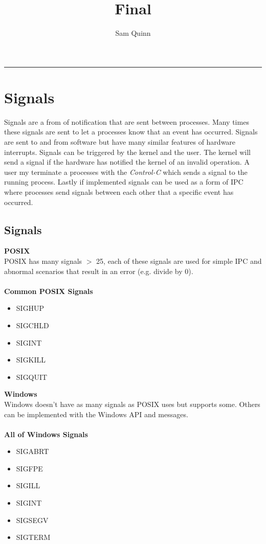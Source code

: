 \documentclass[letterpaper,10pt,notitlepage,fleqn]{article}
\title{Final}
\author{Sam Quinn}
\begin{document}
\maketitle
\hrule

\section{Signals}
Signals are a from of notification that are sent between processes. Many times these signals are sent to let a processes know that an event has occurred. Signals are sent to and from software but have many similar features of hardware interrupts. Signals can be triggered by the kernel and the user. The kernel will send a signal if the hardware has notified the kernel of an invalid operation. A user my terminate a processes with the \textit{Control-C} which sends a signal to the running process. Lastly if implemented signals can be used as a form of IPC where processes send signals between each other that a specific event has occurred.

\subsection{Signals}
\textbf{POSIX} \\
POSIX has many signals $>$ 25, each of these signals are used for simple IPC and abnormal scenarios that result in an error (e.g. divide by 0). \\ \\
\textbf{Common POSIX Signals}
\begin{itemize}
\item SIGHUP
\item SIGCHLD
\item SIGINT
\item SIGKILL
\item SIGQUIT
\end{itemize}

\textbf{Windows} \\
Windows doesn't have as many signals as POSIX uses but supports some. Others can be implemented with the Windows API and messages. \\ \\
\textbf{All of Windows Signals}
\begin{itemize}
\item SIGABRT
\item SIGFPE
\item SIGILL
\item SIGINT
\item SIGSEGV
\item SIGTERM
\end{itemize}
\end{document}
